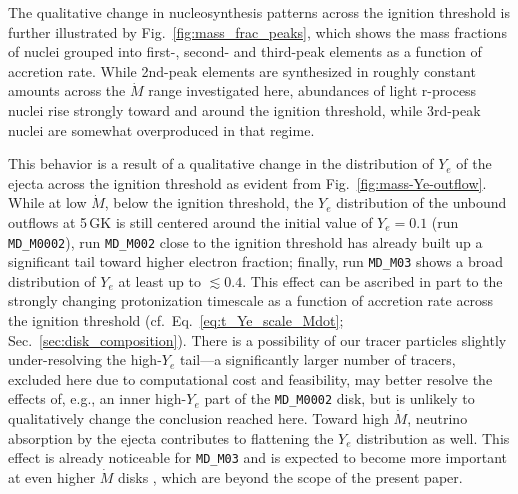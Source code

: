 The qualitative change in nucleosynthesis patterns across the ignition threshold is further illustrated by Fig.~\ref{fig:mass_frac_peaks}, which shows the mass fractions of nuclei grouped into first-, second- and third-peak elements as a function of accretion rate. While 2nd-peak elements are synthesized in roughly constant amounts across the $\dot{M}$ range investigated here, abundances of light r-process nuclei rise strongly toward and around the ignition threshold, while 3rd-peak nuclei are somewhat overproduced in that regime.

This behavior is a result of a qualitative change in the distribution of $Y_e$ of the ejecta across the ignition threshold as evident from Fig.~\ref{fig:mass-Ye-outflow}. While at low $\dot{M}$, below the ignition threshold, the $Y_e$ distribution of the unbound outflows at 5\,GK is still centered around the initial value of $Y_e=0.1$ (run \texttt{MD\_M0002}), run \texttt{MD\_M002} close to the ignition threshold has already built up a significant tail toward higher electron fraction; finally, run \texttt{MD\_M03} shows a broad distribution of $Y_e$ at least up to $\lesssim 0.4$. This effect can be  ascribed in part to the strongly changing protonization timescale as a function of accretion rate across the ignition threshold (cf.~Eq.~\eqref{eq:t_Ye_scale_Mdot}; Sec.~\ref{sec:disk_composition}). There is a possibility of our tracer particles slightly under-resolving the high-$Y_e$ tail---a significantly larger number of tracers, excluded here due to computational cost and feasibility, may better resolve the effects of, e.g., an inner high-$Y_e$ part of the \texttt{MD\_M0002} disk, but is unlikely to qualitatively change the  conclusion reached here. Toward high $\dot{M}$, neutrino absorption by the ejecta contributes to flattening the $Y_e$ distribution as well. This effect is already noticeable for \texttt{MD\_M03} and is expected to become more important at even higher $\dot{M}$ disks \cite{miller_full_2019-1}, which are beyond the scope of the present paper.





